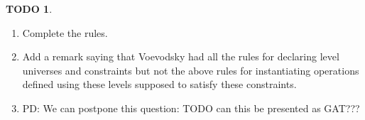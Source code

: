 \documentclass[11pt,a4paper]{article}
\theoremstyle{definition}
\newtheorem{TODO}{TODO}[theorem]
\newcommand{\lam}[1]{{\langle}#1{\rangle}}
\newcommand{\Id}{\mathsf{Id}}
\newcommand{\UU}{\mathsf{U}}
\begin{document}





\begin{TODO}
  \begin{enumerate}
  \item Complete the rules.
  \item Add a remark saying that Voevodsky had all the rules for declaring level universes and
    constraints but not the above rules for instantiating operations defined using these levels
    supposed to satisfy these constraints.

  \item PD: We can postpone this question: TODO   can this be presented as GAT???
   \end{enumerate}
 \end{TODO}
\end{document}
